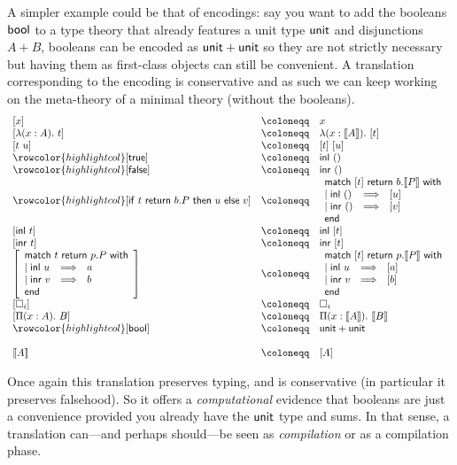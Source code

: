 A simpler example could be that of encodings: say you want to add the booleans
\(\mathsf{bool}\) to a type theory that already features a unit type \(\mathsf{unit}\) and
disjunctions \(A + B\), booleans can be encoded as \(\mathsf{unit} + \mathsf{unit}\) so they
are not strictly necessary but having them as first-class objects can still be
convenient. A translation corresponding to the encoding is conservative and as
such we can keep working on the meta-theory of a minimal theory (without
the booleans).
%
\[
\begin{array}{lcl}
  [ x ] &\coloneqq& x \\ \relax
  [ \lambda (x : A).\ t ] &\coloneqq& \lambda (x : \transl{A}).\ [t] \\
  \relax
  [ t\ u ] &\coloneqq& [t]\ [u] \\
  \rowcolor{highlightcol} \relax
  [ \ttrue ] &\coloneqq& \inl\ \tunit \\
  \rowcolor{highlightcol} \relax
  [ \ffalse ] &\coloneqq& \inr\ \tunit \\
  \rowcolor{highlightcol} \relax
  [ \tif{t}{b. P}{u}{v} ] &\coloneqq&
  \pmatch{[t]}{b. \transl{P}}{\branch{\inl\ \tunit}{[u]} \\ \branch{\inr\ \tunit}{[v]}} \\
  \relax
  [ \inl\ t ] &\coloneqq& \inl\ [t] \\ \relax
  [ \inr\ t ] &\coloneqq& \inr\ [t] \\ \relax
  \left[ \pmatch{t}{p. P}{\branch{\inl\ u}{a} \\ \branch{\inr\ v}{b}} \right]
  &\coloneqq&
  \pmatch{[t]}{p. \transl{P}}{\branch{\inl\ u}{[a]} \\ \branch{\inr\ v}{[b]}} \\
  \relax
  [ \Ty{i} ] &\coloneqq& \Ty{i} \\ \relax
  [ \Pi (x : A).\ B ] &\coloneqq& \Pi (x : \transl{A}).\ \transl{B} \\
  \rowcolor{highlightcol} \relax
  [ \bool ] &\coloneqq& \unit + \unit \\ \relax
  \\
  \transl{A} &\coloneqq& [A]
\end{array}
\]

Once again this translation preserves typing, and is conservative (in particular
it preserves falsehood). So it offers a \emph{computational} evidence that
booleans are just a convenience provided you already have the \(\mathsf{unit}\) type and
sums. In that sense, a translation can---and perhaps should---be seen as
\emph{compilation} or as a compilation phase.
